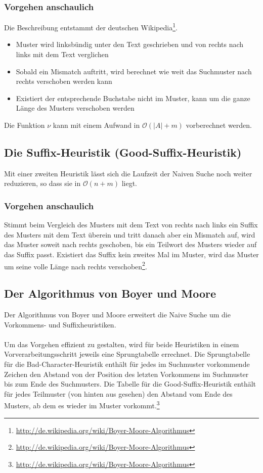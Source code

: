 \subsubsection{Vorgehen anschaulich}
Die Beschreibung entstammt der deutschen Wikipedia\footnote{\url{http://de.wikipedia.org/wiki/Boyer-Moore-Algorithmus}}.
\begin{itemize}
	\item Muster wird linksbündig unter den Text geschrieben und von rechts nach links mit dem Text verglichen
	\item Sobald ein Mismatch auftritt, wird berechnet wie weit das Suchmuster nach rechts verschoben werden kann
	\item Existiert der entsprechende Buchstabe nicht im Muster, kann um die ganze Länge des Musters verschoben werden
\end{itemize}
Die Funktion \(\nu\) kann mit einem Aufwand in \(\mathcal{O}(|A|+m)\) vorberechnet werden.


\subsection{Die Suffix-Heuristik (Good-Suffix-Heuristik)}
Mit einer zweiten Heuristik lässt sich die Laufzeit der Naiven Suche noch weiter reduzieren, so dass sie in \(\mathcal{O}(n+m)\) liegt.

\subsubsection{Vorgehen anschaulich}
Stimmt beim Vergleich des Musters mit dem Text von rechts nach links ein Suffix des Musters mit dem Text überein und tritt danach aber ein Mismatch auf, wird das Muster soweit nach rechts geschoben, bis ein Teilwort des Musters wieder auf das Suffix passt. Existiert das Suffix kein zweites Mal im Muster, wird das Muster um seine volle Länge nach rechts verschoben\footnote{\url{http://de.wikipedia.org/wiki/Boyer-Moore-Algorithmus}}.


\subsection{Der Algorithmus von Boyer und Moore}
Der Algorithmus von Boyer und Moore erweitert die Naive Suche um die Vorkommens- und Suffixheuristiken.
\\\\
Um das Vorgehen effizient zu gestalten, wird für beide Heuristiken in einem Vorverarbeitungsschritt jeweils eine Sprungtabelle errechnet. Die Sprungtabelle für die Bad-Character-Heuristik enthält für jedes im Suchmuster vorkommende Zeichen den Abstand von der Position des letzten Vorkommens im Suchmuster bis zum Ende des Suchmusters. Die Tabelle für die Good-Suffix-Heuristik enthält für jedes Teilmuster (von hinten aus gesehen) den Abstand vom Ende des Musters, ab dem es wieder im Muster vorkommt.\footnote{\url{http://de.wikipedia.org/wiki/Boyer-Moore-Algorithmus}}

